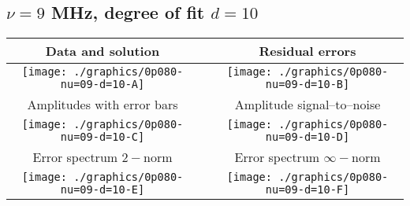 

% 

\clearpage{}
\break{}

\subsection{$\nu = 9$ MHz, degree of fit $d = 10$}

\begin{table}[h]
    \begin{center}
        \begin{tabular}{ccc}
            Data and solution & \quad & Residual errors \\\hline
            \texttt{[image: ./graphics/0p080-nu=09-d=10-A]} &&
            \texttt{[image: ./graphics/0p080-nu=09-d=10-B]} \\[15pt]
            Amplitudes with error bars && Amplitude signal--to--noise \\\hline
            \texttt{[image: ./graphics/0p080-nu=09-d=10-C]} &&
            \texttt{[image: ./graphics/0p080-nu=09-d=10-D]} \\[15pt]
            Error spectrum $2-$norm && Error spectrum $\infty-$norm \\\hline
            \texttt{[image: ./graphics/0p080-nu=09-d=10-E]} &&
            \texttt{[image: ./graphics/0p080-nu=09-d=10-F]} \\[15pt]
        \end{tabular}
    \end{center}
\label{fig:elev=80, nu=9}
\end{table}



\endinput
